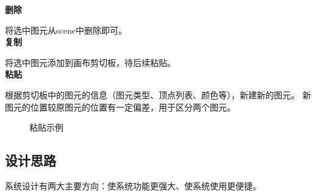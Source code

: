\documentclass[a4paper,UTF8]{article}
\begin{document}
\textbf{删除}

将选中图元从scene中删除即可。\\


\textbf{复制}

将选中图元添加到画布剪切板，待后续粘贴。\\

\textbf{粘贴}

根据剪切板中的图元的信息（图元类型、顶点列表、颜色等），新建新的图元。
新图元的位置较原图元的位置有一定偏差，用于区分两个图元。
\begin{figure}[H]
	\centering
	\caption{粘贴示例}
\end{figure}



\subsection{设计思路}
系统设计有两大主要方向：使系统功能更强大、使系统使用更便捷。
\end{document}
